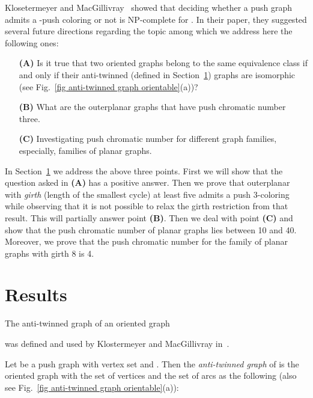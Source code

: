 \documentclass[10pt]{article}
\begin{document}
Klosetermeyer and MacGillivray~\cite{push} showed that deciding whether a push graph admits a -push coloring or not is 
 NP-complete   for .  
In their paper, they  suggested several future directions regarding the topic among which we address here the following ones:

\begin{itemize}
\item[\textbf{(A)}] Is it true that two oriented graphs belong to  the same equivalence class  if and only if their anti-twinned (defined in Section~\ref{sec results}) graphs are isomorphic
 (see Fig.~\ref{fig anti-twinned graph orientable}(a))?


\item[\textbf{(B)}] What are the outerplanar graphs that have push chromatic number three.

\item[\textbf{(C)}] Investigating push chromatic  number for different graph families, especially, families of planar graphs.
\end{itemize}



In Section~\ref{sec results}  we address the above three points. First we will show that the question asked in \textbf{(A)} has a positive answer.  
Then we prove that outerplanar with \textit{girth} (length of the smallest cycle) at least five admits a push 3-coloring 
while observing that it is not possible to relax the girth restriction from that result. This will partially answer point \textbf{(B)}.
Then we deal with point \textbf{(C)} and  show that the push chromatic number of planar graphs lies between 10 and 40. 
Moreover, we prove that the push chromatic number for the family of planar graphs with girth 8 is 4.
 




 
 
 
 
 

 
 



\section{Results}\label{sec results}
The anti-twinned graph  of an oriented graph 
  
  was defined and used by Klostermeyer and MacGillivray in~\cite{push}.

Let  be a push graph with vertex set  and 
. Then the
\textit{anti-twinned graph}  of  is the oriented graph with the set of vertices and the set of arcs as the following (also see Fig.~\ref{fig anti-twinned graph orientable}(a)):
 
\end{document}

